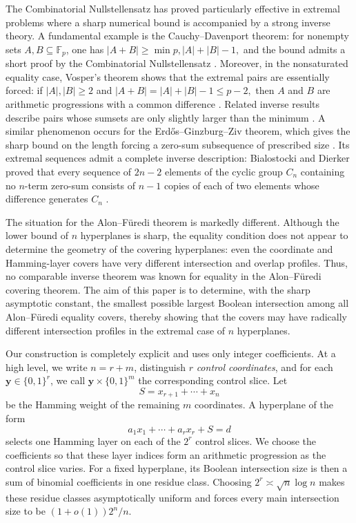 \documentclass[11pt]{article}
\newcommand{\F}{\mathbb{F}}
\newcommand{\1}{\mathbf{1}}
\begin{document}
	The Combinatorial Nullstellensatz has proved particularly effective in extremal problems where a sharp numerical bound is accompanied by a strong inverse theory. A fundamental example is the Cauchy--Davenport theorem: for nonempty sets $A,B\subseteq  \F_p$, one has
	$|A+B|\geq \min{p,|A|+|B|-1},$
	and the bound admits a short proof by the Combinatorial Nullstellensatz \cite{Alon1999}. Moreover, in the nonsaturated equality case, Vosper's theorem shows that the extremal pairs are essentially forced: if $|A|,|B|\geq 2$ and
	$
	|A+B|=|A|+|B|-1\leq p-2,$
	then $A$ and $B$ are arithmetic progressions with a common difference \cite{Vosper1956}. Related inverse results describe pairs whose sumsets are only slightly larger than the minimum \cite{HamidouneRodseth2000}.
	A similar phenomenon occurs for the Erdős–Ginzburg–Ziv theorem,
	which gives the sharp bound on the length forcing a zero-sum subsequence of prescribed size \cite{ErdosGinzburgZiv1961,GaoGeroldinger2006}.
	Its extremal sequences admit a complete inverse description: Bialostocki and Dierker proved that every sequence of $2n-2$ elements of the cyclic group $C_
	n$ containing no $n$-term zero-sum consists of $n-1$ copies of each of two elements whose difference generates $C_n$ \cite{BialostockiDierker1992}.
	
	The situation for the Alon--Füredi theorem is markedly different. Although the lower bound of $n$ hyperplanes is sharp, the equality condition does not appear to determine the geometry of the covering hyperplanes: even the coordinate and Hamming-layer covers have very different intersection and overlap profiles.
	Thus, no comparable inverse theorem  was known for equality in the Alon--F\"uredi covering theorem.  
	The aim of this paper is to determine, with the sharp asymptotic constant, the smallest possible largest Boolean intersection among all Alon–Füredi equality covers, thereby showing that the  covers may have radically different intersection profiles in the extremal case of $n$ hyperplanes.
	
	Our construction is completely explicit and uses only integer coefficients. At a high level, we write $n=r+m$, distinguish $r$ \textit{control coordinates},  and   for each
	$\textbf{y}\in\{0,1\}^r$, we call ${\textbf{y}}\times\{0,1\}^m$
	the corresponding control slice. Let
	\[
	S=x_{r+1}+\cdots+x_n
	\]
	be the Hamming weight of the remaining $m$ coordinates. A hyperplane of the form
	\[
	a_1x_1+\cdots+a_rx_r+S=d
	\]
	selects one Hamming layer on each of the $2^r$ control slices. We choose the coefficients so that these layer indices form an arithmetic progression as the control slice varies. For a fixed hyperplane, its Boolean intersection size is then a sum of binomial coefficients in one residue class. Choosing $2^r\asymp\sqrt n\log n$ makes these residue classes asymptotically uniform and forces every main intersection size to be $(1+o(1))2^n/n$.
	
\end{document}
